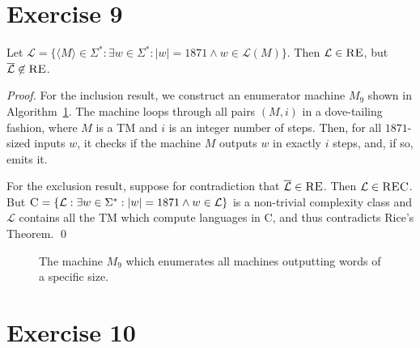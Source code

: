 \documentclass[11pt]{llncs}
\begin{document}
\section*{Exercise 9}
\begin{lemma}
Let
$\mathcal{L} = \{
    \langle M \rangle \in \Sigma^*:
    \exists w \in \Sigma^*:
    |w| = 1871 \land
    w \in \mathcal{L}(M)
\}$. Then $\mathcal{L} \in \textsc{RE}$, but
$\overline{\mathcal{L}} \not \in \textsc{RE}$.
\end{lemma}
\begin{proof}
For the inclusion result, we construct an enumerator machine $M_9$ shown in
Algorithm~\ref{alg.ex9}. The machine loops through all pairs $(M, i)$ in
a dove-tailing fashion, where $M$ is a TM and $i$ is an integer number of steps.
Then, for all $1871$-sized inputs $w$, it checks if the machine $M$ outputs
$w$ in exactly $i$ steps, and, if so, emits it.

For the exclusion result, suppose for contradiction that $\overline{\mathcal{L}}
\in \textsc{RE}$. Then $\mathcal{L} \in \textsc{REC}$. But
$\textsc{C} = \{
    \mathcal{L}:
    \exists w \in \Sigma^*: |w| = 1871 \land w \in \mathcal{L}
\}$
is a non-trivial complexity class and $\mathcal{L}$ contains all the TM which
compute languages in \textsc{C}, and thus contradicts
Rice's Theorem.
\qed
\end{proof}

\begin{figure}[t]
\begin{algorithm}[H]
  \caption{\label{alg.ex9}
      The machine $M_9$ which enumerates all machines
      outputting words of a specific size.
  }
  \begin{algorithmic}[1]
                \EndIf
            \EndFor
        \EndFor
      \EndFunction
  \end{algorithmic}
\end{algorithm}
\end{figure}

\section*{Exercise 10}


\end{document}
